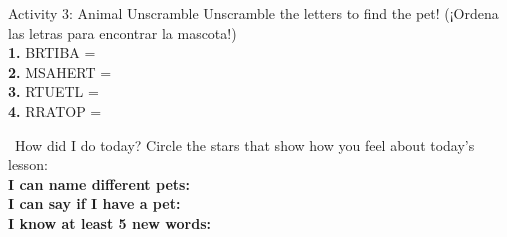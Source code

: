 \begin{activity}{Activity 3: Animal Unscramble}
  Unscramble the letters to find the pet! (¡Ordena las letras para encontrar la mascota!)\\
  \textbf{1.} BRTIBA = \answerline[3cm]\\
  \textbf{2.} MSAHERT = \answerline[3cm]\\
  \textbf{3.} RTUETL = \answerline[3cm]\\
  \textbf{4.} RRATOP = \answerline[3cm]
\end{activity}

\vspace{1em}
\begin{grammartip}{ \ How did I do today?}
  Circle the stars that show how you feel about today's lesson:\\[6pt]
  \textbf{I can name different pets:} \selfcheck[0] \\[4pt]
  \textbf{I can say if I have a pet:} \selfcheck[0] \\[4pt]
  \textbf{I know at least 5 new words:} \selfcheck[0]
\end{grammartip}
